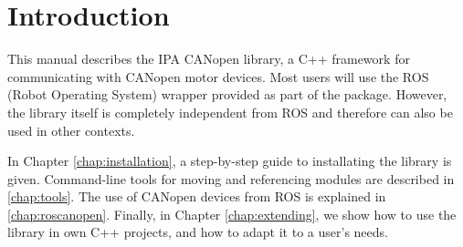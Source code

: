 \chapter{Introduction}
\label{chap:introduction}

This manual describes the IPA CANopen library, a C++ framework for communicating with CANopen motor devices. Most users will use the ROS (Robot Operating System) wrapper provided as part of the package. However, the library itself is completely independent from ROS and therefore can also be used in other contexts.

In Chapter \ref{chap:installation}, a step-by-step guide to installating the library is given. Command-line tools for moving and referencing modules are described in \ref{chap:tools}. The use of CANopen devices from ROS is explained in \ref{chap:roscanopen}. Finally, in Chapter \ref{chap:extending}, we show how to use the library in own C++ projects, and how to adapt it to a user's needs.


